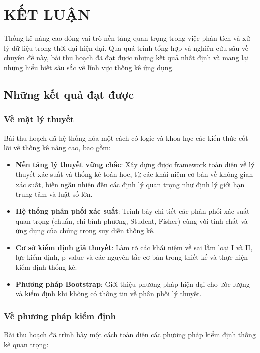 \chapter*{KẾT LUẬN}

Thống kê nâng cao đóng vai trò nền tảng quan trọng trong việc phân tích và xử lý dữ liệu trong thời đại hiện đại. Qua quá trình tổng hợp và nghiên cứu sâu về chuyên đề này, bài thu hoạch đã đạt được những kết quả nhất định và mang lại những hiểu biết sâu sắc về lĩnh vực thống kê ứng dụng.

\section*{Những kết quả đạt được}

\subsection*{Về mặt lý thuyết}
Bài thu hoạch đã hệ thống hóa một cách có logic và khoa học các kiến thức cốt lõi về thống kê nâng cao, bao gồm:

\begin{itemize}
    \item \textbf{Nền tảng lý thuyết vững chắc}: Xây dựng được framework toàn diện về lý thuyết xác suất và thống kê toán học, từ các khái niệm cơ bản về không gian xác suất, biến ngẫu nhiên đến các định lý quan trọng như định lý giới hạn trung tâm và luật số lớn.
    
    \item \textbf{Hệ thống phân phối xác suất}: Trình bày chi tiết các phân phối xác suất quan trọng (chuẩn, chi-bình phương, Student, Fisher) cùng với tính chất và ứng dụng của chúng trong suy diễn thống kê.
    
    \item \textbf{Cơ sở kiểm định giả thuyết}: Làm rõ các khái niệm về sai lầm loại I và II, lực kiểm định, p-value và các nguyên tắc cơ bản trong thiết kế và thực hiện kiểm định thống kê.
    
    \item \textbf{Phương pháp Bootstrap}: Giới thiệu phương pháp hiện đại cho ước lượng và kiểm định khi không có thông tin về phân phối lý thuyết.
\end{itemize}

\subsection*{Về phương pháp kiểm định}
Bài thu hoạch đã trình bày một cách toàn diện các phương pháp kiểm định thống kê quan trọng:


